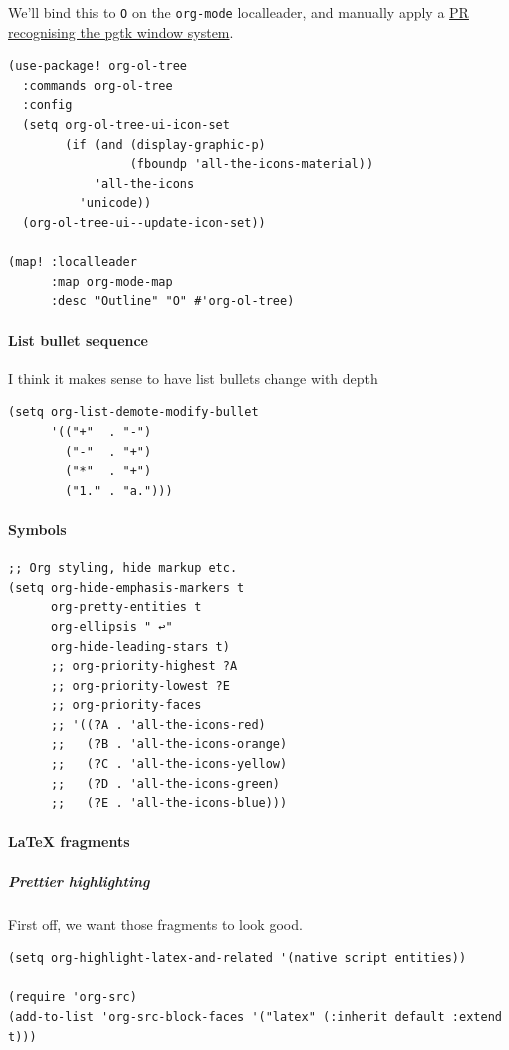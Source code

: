 \documentclass[11pt]{article}
\begin{document}
We’ll bind this to \texttt{O} on the \texttt{org-mode} localleader, and manually apply a \href{https://github.com/Townk/org-ol-tree/pull/13}{PR
recognising the pgtk window system}.

\begin{verbatim}
(use-package! org-ol-tree
  :commands org-ol-tree
  :config
  (setq org-ol-tree-ui-icon-set
        (if (and (display-graphic-p)
                 (fboundp 'all-the-icons-material))
            'all-the-icons
          'unicode))
  (org-ol-tree-ui--update-icon-set))

(map! :localleader
      :map org-mode-map
      :desc "Outline" "O" #'org-ol-tree)
\end{verbatim}

\paragraph{List bullet sequence}
\label{sec:orgd8fe721}
I think it makes sense to have list bullets change with depth

\begin{verbatim}
(setq org-list-demote-modify-bullet
      '(("+"  . "-")
        ("-"  . "+")
        ("*"  . "+")
        ("1." . "a.")))
\end{verbatim}

\paragraph{Symbols}
\label{sec:orgedd713d}

\begin{verbatim}
;; Org styling, hide markup etc.
(setq org-hide-emphasis-markers t
      org-pretty-entities t
      org-ellipsis " ↩"
      org-hide-leading-stars t)
      ;; org-priority-highest ?A
      ;; org-priority-lowest ?E
      ;; org-priority-faces
      ;; '((?A . 'all-the-icons-red)
      ;;   (?B . 'all-the-icons-orange)
      ;;   (?C . 'all-the-icons-yellow)
      ;;   (?D . 'all-the-icons-green)
      ;;   (?E . 'all-the-icons-blue)))
\end{verbatim}

\paragraph{\LaTeX{} fragments}
\label{sec:orgaef5fb3}
\subparagraph{Prettier highlighting}
\label{sec:org8ccea06}
First off, we want those fragments to look good.

\begin{verbatim}
(setq org-highlight-latex-and-related '(native script entities))

(require 'org-src)
(add-to-list 'org-src-block-faces '("latex" (:inherit default :extend t)))
\end{verbatim}
\end{document}
